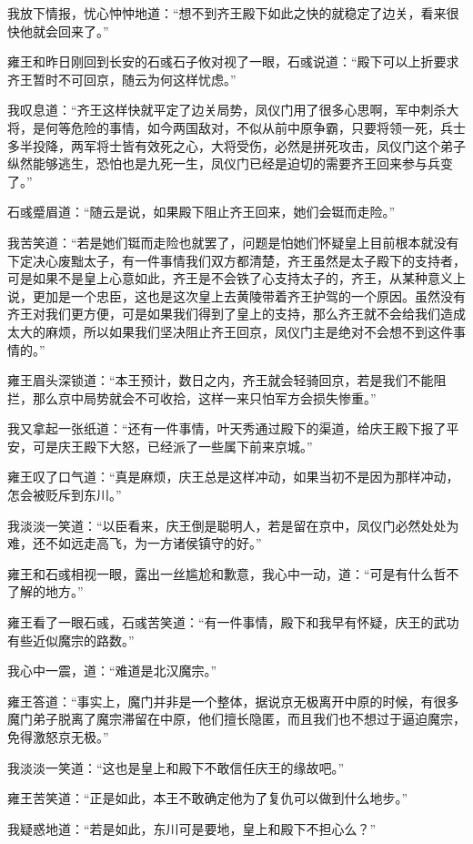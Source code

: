 我放下情报，忧心忡忡地道：“想不到齐王殿下如此之快的就稳定了边关，看来很快他就会回来了。”

雍王和昨日刚回到长安的石彧石子攸对视了一眼，石彧说道：“殿下可以上折要求齐王暂时不可回京，随云为何这样忧虑。”

我叹息道：“齐王这样快就平定了边关局势，凤仪门用了很多心思啊，军中刺杀大将，是何等危险的事情，如今两国敌对，不似从前中原争霸，只要将领一死，兵士多半投降，两军将士皆有效死之心，大将受伤，必然是拼死攻击，凤仪门这个弟子纵然能够逃生，恐怕也是九死一生，凤仪门已经是迫切的需要齐王回来参与兵变了。”

石彧蹙眉道：“随云是说，如果殿下阻止齐王回来，她们会铤而走险。”

我苦笑道：“若是她们铤而走险也就罢了，问题是怕她们怀疑皇上目前根本就没有下定决心废黜太子，有一件事情我们双方都清楚，齐王虽然是太子殿下的支持者，可是如果不是皇上心意如此，齐王是不会铁了心支持太子的，齐王，从某种意义上说，更加是一个忠臣，这也是这次皇上去黄陵带着齐王护驾的一个原因。虽然没有齐王对我们更方便，可是如果我们得到了皇上的支持，那么齐王就不会给我们造成太大的麻烦，所以如果我们坚决阻止齐王回京，凤仪门主是绝对不会想不到这件事情的。”

雍王眉头深锁道：“本王预计，数日之内，齐王就会轻骑回京，若是我们不能阻拦，那么京中局势就会不可收拾，这样一来只怕军方会损失惨重。”

我又拿起一张纸道：“还有一件事情，叶天秀通过殿下的渠道，给庆王殿下报了平安，可是庆王殿下大怒，已经派了一些属下前来京城。”

雍王叹了口气道：“真是麻烦，庆王总是这样冲动，如果当初不是因为那样冲动，怎会被贬斥到东川。”

我淡淡一笑道：“以臣看来，庆王倒是聪明人，若是留在京中，凤仪门必然处处为难，还不如远走高飞，为一方诸侯镇守的好。”

雍王和石彧相视一眼，露出一丝尴尬和歉意，我心中一动，道：“可是有什么哲不了解的地方。”

雍王看了一眼石彧，石彧苦笑道：“有一件事情，殿下和我早有怀疑，庆王的武功有些近似魔宗的路数。”

我心中一震，道：“难道是北汉魔宗。”

雍王答道：“事实上，魔门并非是一个整体，据说京无极离开中原的时候，有很多魔门弟子脱离了魔宗滞留在中原，他们擅长隐匿，而且我们也不想过于逼迫魔宗，免得激怒京无极。”

我淡淡一笑道：“这也是皇上和殿下不敢信任庆王的缘故吧。”

雍王苦笑道：“正是如此，本王不敢确定他为了复仇可以做到什么地步。”

我疑惑地道：“若是如此，东川可是要地，皇上和殿下不担心么？”


